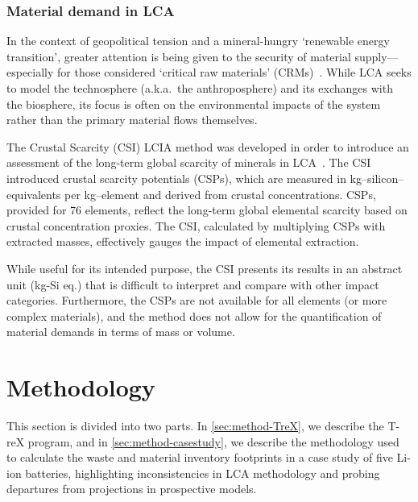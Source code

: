 \documentclass[a4paper,fleqn]{cas-dc}
\begin{document}
\subsubsection{Material demand in LCA}\label{sec:intro-material}

In the context of  geopolitical tension and a mineral-hungry `renewable energy
transition',  greater attention is being given to the security of material
supply---especially for those considered `critical raw materials'
(CRMs)~\citep{eu2023crmstudy,hool2023crm,mancini2013supplysecurity,jrc2023supplychain,hartley2024cepolitics,salviulo2021supplychain,iea2023crm,iea2023energytechperspectives}.
While LCA seeks to model the technosphere (a.k.a.\ the anthroposphere) and its
exchanges with the biosphere, its focus is often on the environmental impacts
of the  system rather than the primary material flows themselves.

The Crustal Scarcity (CSI) LCIA method was developed in order to introduce an
assessment of the long-term global scarcity of minerals in
LCA~\citep{arvidsson2020csi}. The CSI introduced crustal scarcity potentials
(CSPs), which are measured in  kg–silicon–equivalents per  kg–element and
derived from crustal concentrations. CSPs, provided for 76 elements, reflect
the long-term global elemental scarcity based on crustal concentration proxies.
The CSI, calculated by multiplying CSPs with extracted masses, effectively
gauges the impact of elemental extraction.

While useful for its intended purpose, the CSI presents its results in an
abstract unit (kg-Si eq.) that is difficult to interpret and compare with other
impact categories. Furthermore, the CSPs are not available for all elements (or
more complex materials), and the method does not allow for the quantification
of material demands in terms of mass or volume.

\subsection*{}


\section{Methodology}\label{sec:methodology}

This section is divided into two parts. In \autoref{sec:method-TreX}, we
describe the T-reX program, and in \autoref{sec:method-casestudy}, we describe
the methodology used to calculate the waste and material inventory footprints
in a case study of five Li-ion  batteries, highlighting inconsistencies in LCA
methodology and probing departures from projections in prospective models.
\end{document}
